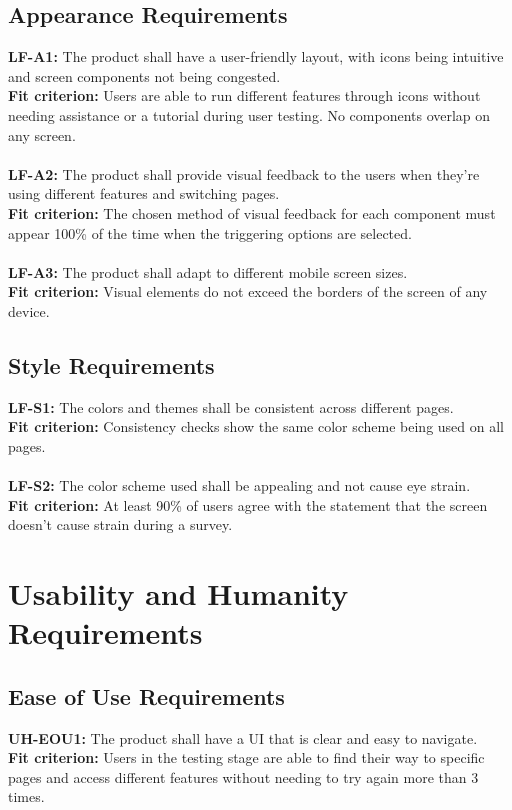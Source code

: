 \documentclass[12pt]{article}
\begin{document}
\subsection{Appearance Requirements}
  \textbf{LF-A1:} The product shall have a user-friendly layout, with icons being intuitive and screen components not being congested.\\
  \textbf{Fit criterion:} Users are able to run different features through icons without needing assistance or a tutorial during user testing. No components overlap on any screen.\\\\
  \textbf{LF-A2:} The product shall provide visual feedback to the users when they're using different features and switching pages.\\
  \textbf{Fit criterion:} The chosen method of visual feedback for each component must appear 100\% of the time when the triggering options are selected.\\\\
  \textbf{LF-A3:} The product shall adapt to different mobile screen sizes.\\
  \textbf{Fit criterion:} Visual elements do not exceed the borders of the screen of any device.\\
\subsection{Style Requirements}
  \textbf{LF-S1:} The colors and themes shall be consistent across different pages.\\
  \textbf{Fit criterion:} Consistency checks show the same color scheme being used on all pages.\\\\
  \textbf{LF-S2:} The color scheme used shall be appealing and not cause eye strain.\\
  \textbf{Fit criterion:} At least 90\% of users agree with the statement that the screen doesn’t cause strain during a survey.\\

\section{Usability and Humanity Requirements}
\subsection{Ease of Use Requirements}
  \textbf{UH-EOU1:} The product shall have a UI that is clear and easy to navigate.\\
  \textbf{Fit criterion:} Users in the testing stage are able to find their way to specific pages and access different features without needing to try again more than 3 times.\\
\end{document}
